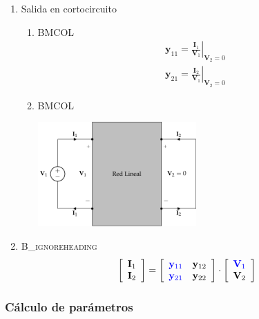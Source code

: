 \begin{enumerate}
\item Salida en cortocircuito
\label{sec:orgb1789af}

\begin{enumerate}
\item \hfill{}\textsc{BMCOL}
\label{sec:org0edf562}
\renewcommand{\arraystretch}{2}
\[
  \begin{array}{c}
    \mathbf{y}_{11} = \left.\frac{\mathbf{I}_1}{\mathbf{V}_1}\right\rvert_{\mathbf{V}_2 = 0} \\
    \mathbf{y}_{21} = \left.\frac{\mathbf{I}_2}{\mathbf{V}_1}\right\rvert_{\mathbf{V}_2 = 0}
  \end{array}
\]

\item \hfill{}\textsc{BMCOL}
\label{sec:org7c2d782}
\begin{center}
\includegraphics[height=4cm]{../figs/parametrosY_entrada.pdf}
\end{center}
\end{enumerate}

\item \hfill{}\textsc{B\_ignoreheading}
\label{sec:orgce1c711}
\[
  \left[
    \begin{array}{c}
      \mathbf{I}_1\\
      \mathbf{I}_2
    \end{array}
  \right] =
  \left[
    \begin{array}{cc}
      \color{blue}{\mathbf{y}_{11}} & \mathbf{y}_{12}\\
      \color{blue}{\mathbf{y}_{21}} & \mathbf{y}_{22}
    \end{array}
  \right] \cdot
  \left[
    \begin{array}{c}
      \color{blue}{\mathbf{V}_1}\\
      \mathbf{V}_2
    \end{array}
  \right]
\]
\end{enumerate}


\subsubsection{Cálculo de parámetros}
\label{sec:org7676724}


